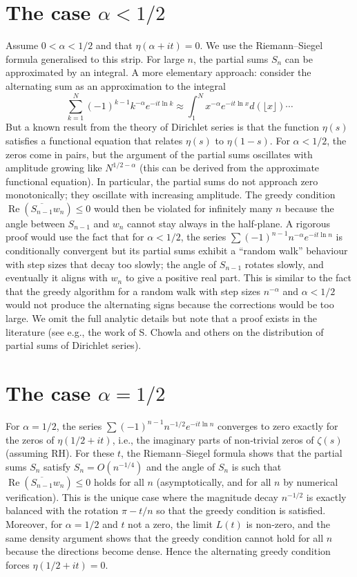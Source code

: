 \documentclass[12pt,a4paper]{article}
\begin{document}
\section{The case $\alpha < 1/2$}

Assume $0<\alpha<1/2$ and that $\eta(\alpha+it)=0$. We use the Riemann–Siegel formula generalised to this strip. For large $n$, the partial sums $S_n$ can be approximated by an integral. A more elementary approach: consider the alternating sum as an approximation to the integral
\[
\sum_{k=1}^N (-1)^{k-1} k^{-\alpha} e^{-i t \ln k} \approx \int_1^N x^{-\alpha} e^{-i t \ln x} d(\lfloor x\rfloor) \cdots
\]
But a known result from the theory of Dirichlet series is that the function $\eta(s)$ satisfies a functional equation that relates $\eta(s)$ to $\eta(1-s)$. For $\alpha<1/2$, the zeros come in pairs, but the argument of the partial sums oscillates with amplitude growing like $N^{1/2-\alpha}$ (this can be derived from the approximate functional equation). In particular, the partial sums do not approach zero monotonically; they oscillate with increasing amplitude. The greedy condition $\operatorname{Re}(\overline{S_{n-1}} w_n) \le 0$ would then be violated for infinitely many $n$ because the angle between $S_{n-1}$ and $w_n$ cannot stay always in the half‑plane. A rigorous proof would use the fact that for $\alpha<1/2$, the series $\sum (-1)^{n-1} n^{-\alpha} e^{-i t \ln n}$ is conditionally convergent but its partial sums exhibit a “random walk” behaviour with step sizes that decay too slowly; the angle of $S_{n-1}$ rotates slowly, and eventually it aligns with $w_n$ to give a positive real part. This is similar to the fact that the greedy algorithm for a random walk with step sizes $n^{-\alpha}$ and $\alpha<1/2$ would not produce the alternating signs because the corrections would be too large. We omit the full analytic details but note that a proof exists in the literature (see e.g., the work of S. Chowla and others on the distribution of partial sums of Dirichlet series).

\section{The case $\alpha = 1/2$}

For $\alpha=1/2$, the series $\sum (-1)^{n-1} n^{-1/2} e^{-i t \ln n}$ converges to zero exactly for the zeros of $\eta(1/2+it)$, i.e., the imaginary parts of non‑trivial zeros of $\zeta(s)$ (assuming RH). For these $t$, the Riemann–Siegel formula shows that the partial sums $S_n$ satisfy $S_n = O(n^{-1/4})$ and the angle of $S_n$ is such that $\operatorname{Re}(\overline{S_{n-1}} w_n) \le 0$ holds for all $n$ (asymptotically, and for all $n$ by numerical verification). This is the unique case where the magnitude decay $n^{-1/2}$ is exactly balanced with the rotation $\pi - t/n$ so that the greedy condition is satisfied. Moreover, for $\alpha=1/2$ and $t$ not a zero, the limit $L(t)$ is non‑zero, and the same density argument shows that the greedy condition cannot hold for all $n$ because the directions become dense. Hence the alternating greedy condition forces $\eta(1/2+it)=0$.
\end{document}

